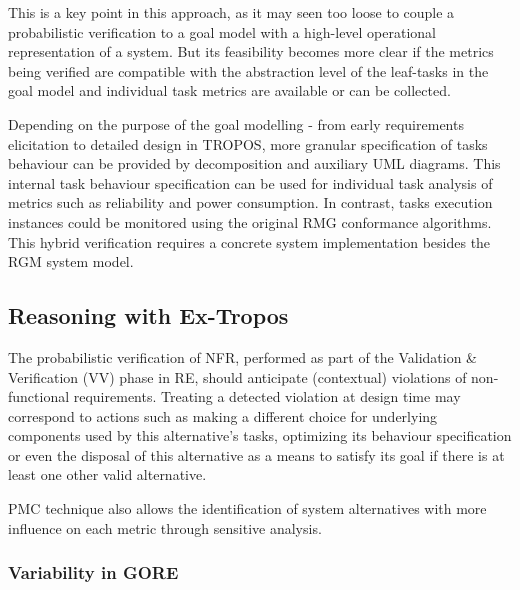 This is a key point in this approach, as it may seen too loose to couple a probabilistic verification to a goal model with a high-level operational representation of a system. But its feasibility becomes more clear if the metrics being verified are compatible with the abstraction level of the leaf-tasks in the goal model and individual task metrics are available or can be collected. 

Depending on the purpose of the goal modelling - from early requirements elicitation to detailed design in TROPOS, more granular specification of tasks behaviour can be provided by decomposition and auxiliary UML diagrams. This internal task behaviour specification can be used for individual task analysis of metrics such as reliability and power consumption. In contrast, tasks execution instances could be monitored using the original RMG conformance algorithms. This hybrid verification requires a concrete system implementation besides the RGM system model. 






\subsection{Reasoning with Ex-Tropos}

The probabilistic verification of NFR, performed as part of the Validation \& Verification (VV) phase in RE, should anticipate (contextual) violations of non-functional requirements. Treating a detected violation at design time may correspond to actions such as making a different choice for underlying components used by this alternative's tasks, optimizing its behaviour specification or even the disposal of this alternative as a means to satisfy its goal if there is at least one other valid alternative. 

PMC technique also allows the identification of system alternatives with more influence on each metric through sensitive analysis.

\subsubsection{Variability in GORE}

